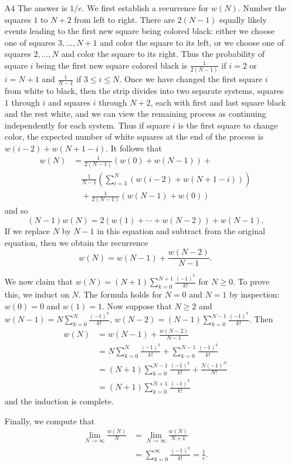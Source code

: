 \documentclass[amssymb,twocolumn,pra,10pt,aps]{revtex4-1}
\begin{document}
\begin{itemize}
\item[A4]
The answer is $1/e$. We first establish a recurrence for $w(N)$. Number the squares $1$ to $N+2$ from left to right. There are $2(N-1)$ equally likely events leading to the first new square being colored black: either we choose one of squares $3,\ldots,N+1$ and color the square to its left, or we choose one of squares $2,\ldots,N$ and color the square to its right. Thus the probability of square $i$ being the first new square colored black is $\frac{1}{2(N-1)}$ if $i=2$ or $i=N+1$ and $\frac{1}{N-1}$ if $3\leq i\leq N$. Once we have changed the first square $i$ from white to black, then the strip divides into two separate systems, squares $1$ through $i$ and squares $i$ through $N+2$, each with first and last square black and the rest white, and we can view the remaining process as continuing independently for each system. Thus if square $i$ is the first square to change color, the expected number of white squares at the end of the process is $w(i-2)+w(N+1-i)$. It follows that
\begin{align*}
w(N) &= \frac{1}{2(N-1)}(w(0)+w(N-1))+\\
&\quad \frac{1}{N-1}\left(\sum_{i=3}^N (w(i-2)+w(N+1-i))\right) \\
&\quad + \frac{1}{2(N-1)}(w(N-1)+w(0))
\end{align*}
and so 
\[
(N-1)w(N) = 2(w(1)+\cdots+w(N-2))+w(N-1). 
\]
If we replace $N$ by $N-1$ in this equation and subtract from the original equation, then we obtain the recurrence
\[
w(N) = w(N-1)+\frac{w(N-2)}{N-1}.
\]

We now claim that $w(N) = (N+1) \sum_{k=0}^{N+1} \frac{(-1)^k}{k!}$ for $N\geq 0$. To prove this, we induct on $N$. The formula holds for $N=0$ and $N=1$ by inspection: $w(0)=0$ and $w(1)=1$. Now suppose that $N\geq 2$ and $w(N-1) = N\sum_{k=0}^N \frac{(-1)^k}{k!}$, $w(N-2)=(N-1)\sum_{k=0}^{N-1} \frac{(-1)^k}{k!}$. Then
\begin{align*}
w(N) &= w(N-1)+\frac{w(N-2)}{N-1} \\
&= N \sum_{k=0}^N \frac{(-1)^k}{k!} + \sum_{k=0}^{N-1} \frac{(-1)^k}{k!} \\
& = (N+1) \sum_{k=0}^{N-1} \frac{(-1)^k}{k!}+\frac{N(-1)^N}{N!}\\
&= (N+1) \sum_{k=0}^{N+1} \frac{(-1)^k}{k!}
\end{align*}
and the induction is complete.

Finally, we compute that 
\begin{align*}
\lim_{N\to\infty} \frac{w(N)}{N} &= \lim_{N\to\infty} \frac{w(N)}{N+1} \\
&= \sum_{k=0}^\infty \frac{(-1)^k}{k!} = \frac{1}{e}.
\end{align*}


\end{itemize}
\end{document}
